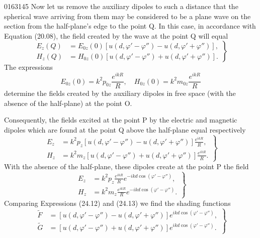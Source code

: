 \begin{scanpage}{0163}{145}
Now let us remove the auxiliary dipoles to such a distance that the spherical wave arriving from them may be considered to be a plane wave on the section from the half-plane's edge to the point Q. In this case, in accordance with Equation (20.08), the field created by the wave at the point Q will equal
\[
\left.\begin{aligned}E_z(Q)&=E_{0z}(0)[u(d,\varphi'-\varphi'')-u(d,\varphi'+\varphi'')],\\
H_z(Q)&=H_{0z}(0)[u(d,\varphi'-\varphi'')+u(d,\varphi'+\varphi'')].
\end{aligned}\right\}\tag{24.10}
\]
The expressions
\[
E_{0z}(0)=k^2p_{0z}\frac{e^{ikR}}R,\quad H_{0z}(0)=k^2m_{0z}\frac{e^{ikR}}R\tag{24.11}
\]
determine the fields created by the auxiliary dipoles in free space (with the absence of the half-plane) at the point O.

Consequently, the fields excited at the point P by the electric and magnetic dipoles which are found at the point Q above the half-plane equal respectively
\[
\left.\begin{aligned}E_z&=k^2p_z[u(d,\varphi'-\varphi'')-u(d,\varphi'+\varphi'')]\frac{e^{ikR}}R,\\
H_z&=k^2m_z[u(d,\varphi'-\varphi'')+u(d,\varphi'+\varphi'')]\frac{e^{ikR}}R.
\end{aligned}\right\}\tag{24.12}
\]
With the absence of the half-plane, these dipoles create at the point P the field
\[
\left.\begin{aligned}E_z&=k^2p_z\frac{e^{ikR}}R e^{-ikd\cos(\varphi'-\varphi'')},\\
H_z&=k^2m_z\frac{e^{ikR}}R e^{-ikd\cos(\varphi'-\varphi'')}.
\end{aligned}\right\}\tag{24.13}
\]
Comparing Expressions (24.12) and (24.13) we find the shading functions
\[
\left.\begin{aligned}\widetilde F&=[u(d,\varphi'-\varphi'')-u(d,\varphi'+\varphi'')]e^{ikd\cos(\varphi'-\varphi'')},\\
\widetilde G&=[u(d,\varphi'-\varphi'')+u(d,\varphi'+\varphi'')]e^{ikd\cos(\varphi'-\varphi'')}.
\end{aligned}\right\}\tag{24.14}
\]
\end{scanpage}
